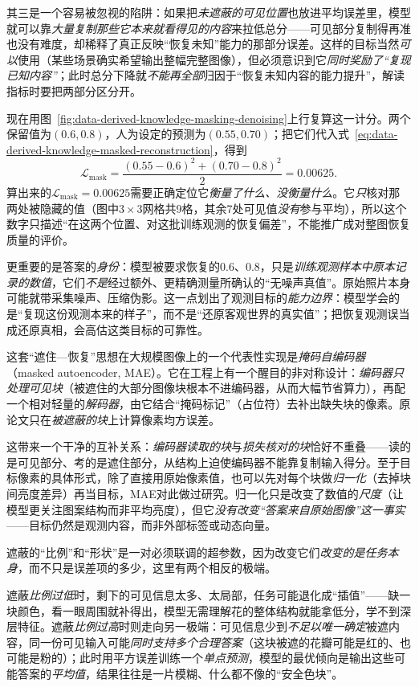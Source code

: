 其三是一个容易被忽视的陷阱：如果把\emph{未遮蔽的可见位置}也放进平均误差里，模型就可以靠\emph{大量复制那些它本来就看得见的内容}来拉低总分——可见部分复制得再准也没有难度，却稀释了真正反映“恢复未知”能力的那部分误差。这样的目标当然\emph{可以}使用（某些场景确实希望输出整幅完整图像），但必须意识到它\emph{同时奖励了“复现已知内容”}；此时总分下降就\emph{不能再全部}归因于“恢复未知内容的能力提升”，解读指标时要把两部分区分开。

现在用图~\ref{fig:data-derived-knowledge-masking-denoising}上行复算这一计分。两个保留值为$(0.6,0.8)$，人为设定的预测为$(0.55,0.70)$；把它们代入式~\eqref{eq:data-derived-knowledge-masked-reconstruction}，得到
\[
  \mathcal{L}_{\mathrm{mask}}
  =\frac{(0.55-0.6)^2+(0.70-0.8)^2}{2}
  =0.00625.
\]
算出来的$\mathcal{L}_{\mathrm{mask}}=0.00625$需要正确定位它\emph{衡量了什么、没衡量什么}。它\emph{只}核对那两处被隐藏的值（图中$3\times3$网格共9格，其余7处可见值\emph{没有}参与平均），所以这个数字只描述“在这两个位置、对这批训练观测的恢复偏差”，不能推广成对整图恢复质量的评价。

更重要的是答案的\emph{身份}：模型被要求恢复的$0.6$、$0.8$，只是\emph{训练观测样本中原本记录的数值}，它们\emph{不是}经过额外、更精确测量所确认的“无噪声真值”。原始照片本身可能就带采集噪声、压缩伪影。这一点划出了观测目标的\emph{能力边界}：模型学会的是“复现这份观测本来的样子”，而不是“还原客观世界的真实值”；把恢复观测误当成还原真相，会高估这类目标的可靠性。

这套“遮住—恢复”思想在大规模图像上的一个代表性实现是\emph{掩码自编码器}（masked autoencoder, MAE）。它在工程上有一个醒目的非对称设计：\emph{编码器只处理可见块}（被遮住的大部分图像块根本不进编码器，从而大幅节省算力），再配一个相对轻量的\emph{解码器}，由它结合“掩码标记”（占位符）去补出缺失块的像素。原论文只在\emph{被遮蔽的块}上计算像素均方误差。

这带来一个干净的互补关系：\emph{编码器读取的块}与\emph{损失核对的块}恰好不重叠——读的是可见部分、考的是遮住部分，从结构上迫使编码器不能靠复制输入得分。至于目标像素的具体形式，除了直接用原始像素值，也可以先对每个块做\emph{归一化}（去掉块间亮度差异）再当目标，MAE对此做过研究。归一化只是改变了数值的\emph{尺度}（让模型更关注图案结构而非平均亮度），但它\emph{没有改变“答案来自原始图像”这一事实}——目标仍然是观测内容，而非外部标签或动态向量。

遮蔽的“比例”和“形状”是一对必须联调的超参数，因为改变它们\emph{改变的是任务本身}，而不只是误差项的多少，这里有两个相反的极端。

遮蔽\emph{比例过低}时，剩下的可见信息太多、太局部，任务可能退化成“插值”——缺一块颜色，看一眼周围就补得出，模型无需理解花的整体结构就能拿低分，学不到深层特征。遮蔽\emph{比例过高}时则走向另一极端：可见信息少到\emph{不足以唯一确定}被遮内容，同一份可见输入可能\emph{同时支持多个合理答案}（这块被遮的花瓣可能是红的、也可能是粉的）；此时用平方误差训练一个\emph{单点预测}，模型的最优倾向是输出这些可能答案的\emph{平均值}，结果往往是一片模糊、什么都不像的“安全色块”。

